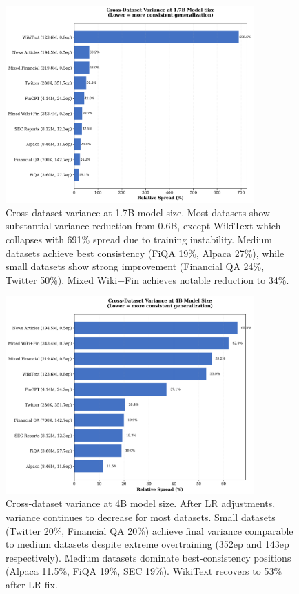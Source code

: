 \begin{figure}[htbp]
\centering
\includegraphics[width=0.85\textwidth]{figures/bar_variance_17b.png}
\caption[Variance at 1.7B Model Size]{Cross-dataset variance at 1.7B model size. Most datasets show substantial variance reduction from 0.6B, except WikiText which collapses with 691\% spread due to training instability. Medium datasets achieve best consistency (FiQA 19\%, Alpaca 27\%), while small datasets show strong improvement (Financial QA 24\%, Twitter 50\%). Mixed Wiki+Fin achieves notable reduction to 34\%.}
\label{fig:bar_variance_17b}
\end{figure}

\begin{figure}[htbp]
\centering
\includegraphics[width=0.85\textwidth]{figures/bar_variance.png}
\caption[Variance at 4B Model Size]{Cross-dataset variance at 4B model size. After LR adjustments, variance continues to decrease for most datasets. Small datasets (Twitter 20\%, Financial QA 20\%) achieve final variance comparable to medium datasets despite extreme overtraining (352ep and 143ep respectively). Medium datasets dominate best-consistency positions (Alpaca 11.5\%, FiQA 19\%, SEC 19\%). WikiText recovers to 53\% after LR fix.}
\label{fig:bar_variance_4b}
\end{figure}

